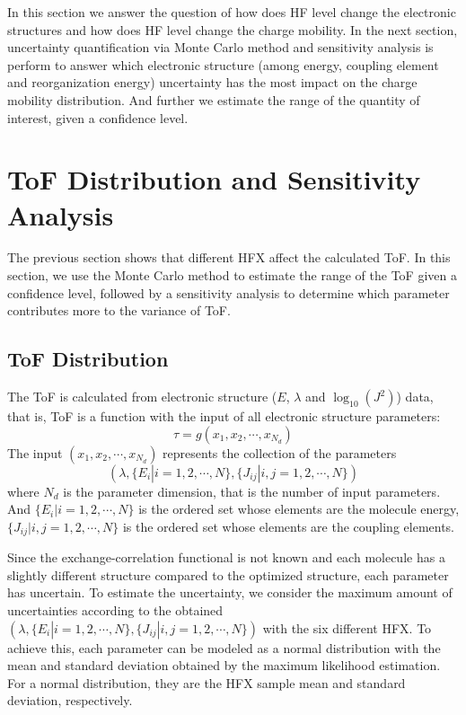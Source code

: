 \documentclass[letterpaper,12pt]{article}
\begin{document}
In this section we answer the question of how does HF level change the electronic structures and 
how does HF level change the charge mobility. 
In the next section, uncertainty quantification via Monte Carlo method and sensitivity analysis is perform to answer which electronic structure (among energy, coupling element and reorganization energy) uncertainty has the most impact on the charge mobility distribution. 
And further we estimate the range of the quantity of interest, given a confidence level.

\section{ToF Distribution and Sensitivity Analysis}
The previous section shows that different HFX affect the calculated ToF. In this section, we use the Monte Carlo method to estimate the range of the ToF given a confidence level, followed by a sensitivity analysis to determine which parameter contributes more to the variance of ToF. 

\subsection{ToF Distribution}
The ToF is calculated from electronic structure ($E$, $\lambda$ and $\log_{10}(J^2)$) data, that is, ToF is a function with the input of all electronic structure parameters:
\begin{equation}
    \tau = g(x_1, x_2, \cdots, x_{N_d})
\end{equation}
The input $(x_1, x_2, \cdots, x_{N_d})$ represents the collection of the parameters $$(\lambda, \{E_i|i=1,2,\cdots,N \}, \{J_{ij}|i,j=1,2,\cdots,N \})$$  where $N_d$ is the parameter dimension, that is the number of input parameters. 
And $\{E_i|i=1,2,\cdots,N \}$ is the ordered set whose elements are the molecule energy,
$\{J_{ij}|i,j=1,2,\cdots,N \}$ is the ordered set whose elements are the coupling elements. 

Since the exchange-correlation functional is not known and each molecule has a slightly different structure compared to the optimized structure, each parameter has uncertain. 
To estimate the uncertainty, we consider the maximum amount of uncertainties according to the obtained $(\lambda, \{E_i|i=1,2,\cdots,N \}, \{J_{ij}|i,j=1,2,\cdots,N \})$ with the six different HFX.
To achieve this, each parameter can be modeled as a normal distribution with the mean and standard deviation obtained by the maximum likelihood estimation. For a normal distribution, they are the HFX sample mean and standard deviation, respectively.
\end{document}
